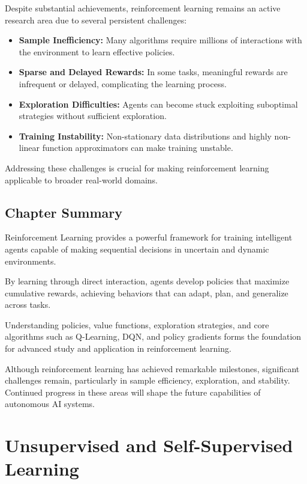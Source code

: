 \documentclass[openany]{book}
\begin{document}
Despite substantial achievements, reinforcement learning remains an active 
research area due to several persistent challenges:

\begin{itemize}
    \item \textbf{Sample Inefficiency:} Many algorithms require millions of 
    interactions with the environment to learn effective policies.
    \item \textbf{Sparse and Delayed Rewards:} In some tasks, meaningful rewards 
    are infrequent or delayed, complicating the learning process.
    \item \textbf{Exploration Difficulties:} Agents can become stuck exploiting 
    suboptimal strategies without sufficient exploration.
    \item \textbf{Training Instability:} Non-stationary data distributions and 
    highly non-linear function approximators can make training unstable.
\end{itemize}

Addressing these challenges is crucial for making reinforcement learning 
applicable to broader real-world domains.

\section{Chapter Summary}

Reinforcement Learning provides a powerful framework for training intelligent 
agents capable of making sequential decisions in uncertain and dynamic 
environments.

By learning through direct interaction, agents develop policies that maximize 
cumulative rewards, achieving behaviors that can adapt, plan, and generalize 
across tasks.

Understanding policies, value functions, exploration strategies, and core 
algorithms such as Q-Learning, DQN, and policy gradients forms the foundation 
for advanced study and application in reinforcement learning.

Although reinforcement learning has achieved remarkable milestones, significant 
challenges remain, particularly in sample efficiency, exploration, and 
stability. Continued progress in these areas will shape the future capabilities 
of autonomous AI systems.

\chapter{Unsupervised and Self-Supervised Learning}
\end{document}
